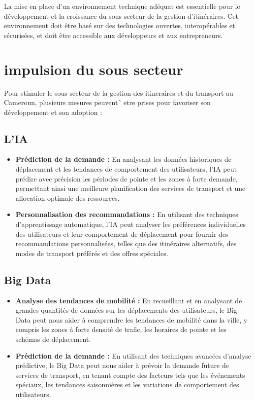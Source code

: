 \documentclass{article}
\begin{document}
La mise en place d'un environnement technique adéquat est essentielle pour le 
développement et la croissance du sous-secteur de la gestion d'itinéraires. Cet environnement doit être basé sur des technologies ouvertes, interopérables et sécurisées, et doit être accessible aux développeurs et aux entrepreneurs.



\section{impulsion du sous secteur}


Pour stimuler le sous-secteur de la gestion des itineraires et du transport au
 Cameroun, plusieurs mesures peuventˆ etre prises pour favoriser son développement
 et son adoption :

 \subsection{L'IA}

\begin{itemize}
    \item \textbf{Prédiction de la demande :} En analysant les données historiques de déplacement et les tendances de comportement des utilisateurs, l'IA peut prédire avec précision les périodes de pointe et les zones à forte demande, permettant ainsi une meilleure planification des services de transport et une allocation optimale des ressources.
    
    \item \textbf{Personnalisation des recommandations :} En utilisant des techniques d'apprentissage automatique, l'IA peut analyser les préférences individuelles des utilisateurs et leur comportement de déplacement pour fournir des recommandations personnalisées, telles que des itinéraires alternatifs, des modes de transport préférés et des offres spéciales.
\end{itemize}
\subsection{Big Data}

\begin{itemize}
    \item \textbf{Analyse des tendances de mobilité :} En recueillant et en analysant de grandes quantités de données sur les déplacements des utilisateurs, le Big Data peut nous aider à comprendre les tendances de mobilité dans la ville, y compris les zones à forte densité de trafic, les horaires de pointe et les schémas de déplacement.
    
    \item \textbf{Prédiction de la demande :} En utilisant des techniques avancées d'analyse prédictive, le Big Data peut nous aider à prévoir la demande future de services de transport, en tenant compte des facteurs tels que les événements spéciaux, les tendances saisonnières et les variations de comportement des utilisateurs.
\end{itemize}
\end{document}
